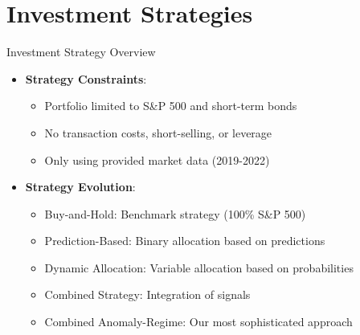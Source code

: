 \documentclass[aspectratio=169,xcolor=dvipsnames]{beamer}
\begin{document}
\section{Investment Strategies}
\begin{frame}{Investment Strategy Overview}
    \begin{itemize}
        \item \textbf{Strategy Constraints}:
              \begin{itemize}
                  \item Portfolio limited to S\&P 500 and short-term bonds
                  \item No transaction costs, short-selling, or leverage
                  \item Only using provided market data (2019-2022)
              \end{itemize}
        \item \textbf{Strategy Evolution}:
              \begin{itemize}
                  \item Buy-and-Hold: Benchmark strategy (100\% S\&P 500)
                  \item Prediction-Based: Binary allocation based on predictions
                  \item Dynamic Allocation: Variable allocation based on probabilities
                  \item Combined Strategy: Integration of signals
                  \item \alert{Combined Anomaly-Regime}: Our most sophisticated approach
              \end{itemize}
    \end{itemize}
\end{frame}
\end{document}
